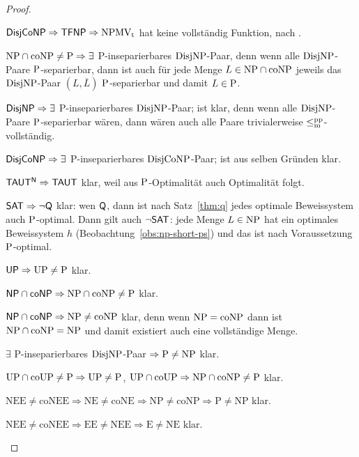 \begin{proof}
\begin{Prooflist}[nosep,midpenalty=0, label={\arabic*.},labelsep=3pt]
\item $\hDisjCoNP \Rightarrow \hTFNP \Rightarrow \NPMVt$ hat keine vollständig Funktion, nach \textcite[Prop.~5.6, 5.10]{pudlak_incompleteness_2017}.
\item $\NP\cap\coNP\neq \P \Rightarrow\exists$ P-inseparierbares $\DisjNP$-Paar, denn wenn alle $\DisjNP$-Paare $\P$-separierbar, dann ist auch für jede Menge $L\in\NP\cap\coNP$ jeweils das $\DisjNP$-Paar $(L,\overline{L})$ $\P$-separierbar und damit $L\in\P$.
\item $\hDisjNP \Rightarrow \exists$ P-inseparierbares $\DisjNP$-Paar; ist klar, denn wenn alle $\DisjNP$-Paare $\P$-separierbar wären, dann wären auch alle Paare trivialerweise $\leqmpp$-vollständig.
\item $\hDisjCoNP \Rightarrow \exists$ P-inseparierbares $\DisjCoNP$-Paar; ist aus selben Gründen klar.
\item $\mathsf{TAUT^N} \Rightarrow \hTAUT$ klar, weil aus $\P$-Optimalität auch Optimalität folgt.
\item $\mathsf \hSAT \Rightarrow \neg\hQ $ klar: wen $\hQ$, dann ist nach Satz~\ref{thm:q} jedes optimale Beweissystem auch $\P$-optimal. Dann gilt auch $\neg\hSAT$: jede Menge $L\in\NP$ hat ein optimales Beweissystem $h$ (Beobachtung~\ref{obs:np-short-ps}) und das ist nach Voraussetzung $\P$-optimal.
\item $\hUP \Rightarrow \UP\neq\P$ klar.
\item $\hNPcoNP \Rightarrow \NP\cap\coNP\neq \P$ klar.
\item $\hNPcoNP \Rightarrow \NP\neq\coNP$ klar, denn wenn $\NP=\coNP$ dann ist $\NP\cap\coNP=\NP$ und damit existiert auch eine vollständige Menge.
\item $\exists$ P-inseparierbares $\DisjNP$-Paar $\Rightarrow \P\neq \NP$ klar.
\item $\UP\cap\coUP\neq\P \Rightarrow \UP\neq \P$, $\UP\cap\coUP\Rightarrow \NP\cap\coNP\neq\P$ klar.
\item $\mathrm{NEE\neq coNEE \Rightarrow NE \neq coNE \Rightarrow NP \neq coNP \Rightarrow P\neq NP}$ klar.
\item $\mathrm{NEE\neq coNEE \Rightarrow EE \neq NEE \Rightarrow E\neq NE}$ klar.\qedhere
\end{Prooflist}
\end{proof}

